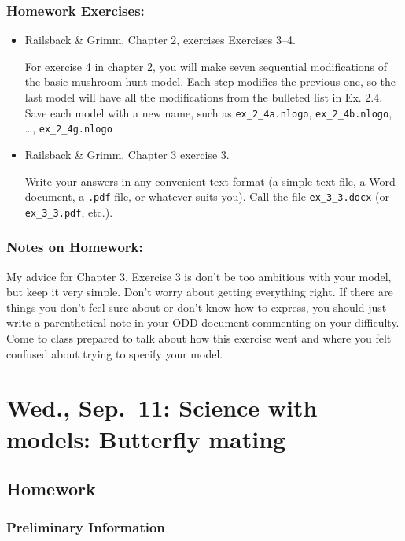 \documentclass[
]{article}
\begin{document}
\subsubsection{Homework Exercises:}\label{homework-exercises-3}

\begin{itemize}
\item
  Railsback \& Grimm, Chapter 2, exercises Exercises 3--4.

  For exercise 4 in chapter 2, you will make seven sequential
  modifications of the basic mushroom hunt model. Each step modifies the
  previous one, so the last model will have all the modifications from
  the bulleted list in Ex. 2.4. Save each model with a new name, such as
  \texttt{ex\_2\_4a.nlogo}, \texttt{ex\_2\_4b.nlogo}, \dots,
  \texttt{ex\_2\_4g.nlogo}
\item
  Railsback \& Grimm, Chapter 3 exercise 3.

  Write your answers in any convenient text format (a simple text file,
  a Word document, a \texttt{.pdf} file, or whatever suits you). Call
  the file \texttt{ex\_3\_3.docx} (or \texttt{ex\_3\_3.pdf}, etc.).
\end{itemize}

\subsubsection{Notes on Homework:}\label{notes-on-homework-1}

My advice for Chapter 3, Exercise 3 is don't be too ambitious with your
model, but keep it very simple. Don't worry about getting everything
right. If there are things you don't feel sure about or don't know how
to express, you should just write a parenthetical note in your ODD
document commenting on your difficulty. Come to class prepared to talk
about how this exercise went and where you felt confused about trying to
specify your model.

\section{Wed., Sep.~11: Science with models: Butterfly
mating}\label{wed.-sep.-11-science-with-models-butterfly-mating}

\subsection{Homework}\label{homework-4}

\subsubsection{Preliminary Information}\label{preliminary-information-3}
\end{document}
